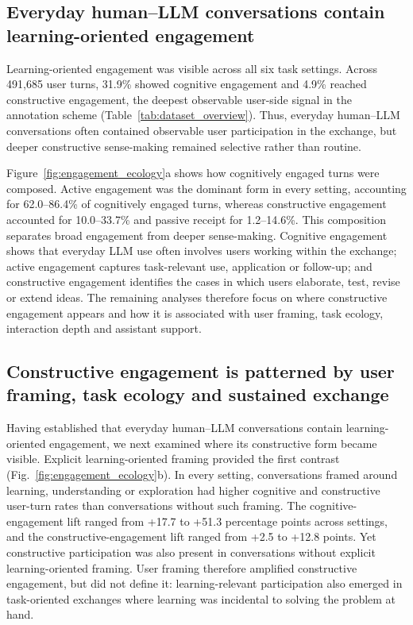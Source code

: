 \subsection{Everyday human--LLM conversations contain learning-oriented engagement}\label{subsec:2.1}

Learning-oriented engagement was visible across all six task settings. Across 491,685 user turns, 31.9\% showed cognitive engagement and 4.9\% reached constructive engagement,  the deepest observable user-side signal in the annotation scheme (Table~\ref{tab:dataset_overview}). Thus, everyday human--LLM conversations often contained observable user participation in the exchange, but deeper constructive sense-making remained selective rather than routine.









Figure~\ref{fig:engagement_ecology}a shows how cognitively engaged turns were composed. Active engagement was the dominant form in every setting, accounting for 62.0--86.4\% of cognitively engaged turns, whereas constructive engagement accounted for 10.0--33.7\% and passive receipt for 1.2--14.6\%. This composition separates broad engagement from deeper sense-making. Cognitive engagement shows that everyday LLM use often involves users working within the exchange; active engagement captures task-relevant use, application or follow-up; and constructive engagement identifies the cases in which users elaborate, test, revise or extend ideas. The remaining analyses therefore focus on where constructive engagement appears and how it is associated with user framing, task ecology, interaction depth and assistant support.








\subsection{Constructive engagement is patterned by user framing, task ecology and sustained exchange}\label{subsec:2.2}

Having established that everyday human--LLM conversations contain learning-oriented engagement, we next examined where its constructive form became visible. Explicit learning-oriented framing provided the first contrast (Fig.~\ref{fig:engagement_ecology}b). In every setting, conversations framed around learning, understanding or exploration had higher cognitive and constructive user-turn rates than conversations without such framing. The cognitive-engagement lift ranged from +17.7 to +51.3 percentage points across settings, and the constructive-engagement lift ranged from +2.5 to +12.8 points. Yet constructive participation was also present in conversations without explicit learning-oriented framing. User framing therefore amplified constructive engagement, but did not define it: learning-relevant participation also emerged in task-oriented exchanges where learning was incidental to solving the problem at hand.


